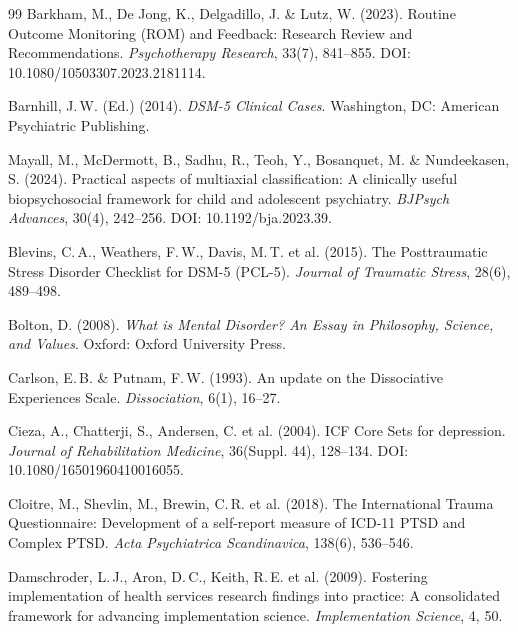 \documentclass[11pt,a4paper]{article}
\begin{document}
\begin{thebibliography}{99}
Barkham, M., De Jong, K., Delgadillo, J. \& Lutz, W. (2023).
\newblock Routine Outcome Monitoring (ROM) and Feedback: Research Review and Recommendations.
\newblock \textit{Psychotherapy Research}, 33(7), 841--855. DOI: 10.1080/10503307.2023.2181114.

Barnhill, J.\,W. (Ed.) (2014).
\newblock \textit{DSM-5 Clinical Cases}.
\newblock Washington, DC: American Psychiatric Publishing.

Mayall, M., McDermott, B., Sadhu, R., Teoh, Y., Bosanquet, M. \& Nundeekasen, S. (2024).
\newblock Practical aspects of multiaxial classification: A clinically useful biopsychosocial framework for child and adolescent psychiatry.
\newblock \textit{BJPsych Advances}, 30(4), 242--256. DOI: 10.1192/bja.2023.39.

Blevins, C.\,A., Weathers, F.\,W., Davis, M.\,T. et al. (2015).
\newblock The Posttraumatic Stress Disorder Checklist for DSM-5 (PCL-5).
\newblock \textit{Journal of Traumatic Stress}, 28(6), 489--498.

Bolton, D. (2008).
\newblock \textit{What is Mental Disorder? An Essay in Philosophy, Science, and Values}.
\newblock Oxford: Oxford University Press.

Carlson, E.\,B. \& Putnam, F.\,W. (1993).
\newblock An update on the Dissociative Experiences Scale.
\newblock \textit{Dissociation}, 6(1), 16--27.

Cieza, A., Chatterji, S., Andersen, C. et al. (2004).
\newblock ICF Core Sets for depression.
\newblock \textit{Journal of Rehabilitation Medicine}, 36(Suppl. 44), 128--134. DOI: 10.1080/16501960410016055.

Cloitre, M., Shevlin, M., Brewin, C.\,R. et al. (2018).
\newblock The International Trauma Questionnaire: Development of a self-report measure of ICD-11 PTSD and Complex PTSD.
\newblock \textit{Acta Psychiatrica Scandinavica}, 138(6), 536--546.

Damschroder, L.\,J., Aron, D.\,C., Keith, R.\,E. et al. (2009).
\newblock Fostering implementation of health services research findings into practice: A consolidated framework for advancing implementation science.
\newblock \textit{Implementation Science}, 4, 50.


\end{thebibliography}
\end{document}
